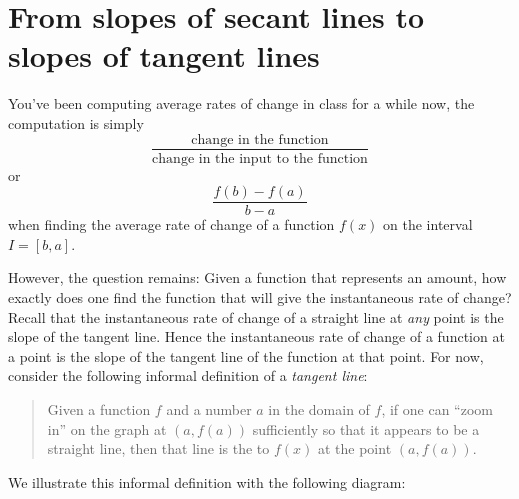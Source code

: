 \documentclass{ximera}
\begin{document}
\section{From slopes of secant lines to slopes of tangent lines}

You've been computing average rates of change in class for a while now,
the computation is simply
\[
\frac{\text{change in the function}}{\text{change in the input to the
    function}}
\]
or
\[
\frac{f(b)-f(a)}{b-a}
\]
when finding the average rate of change of a function $f(x)$ on the interval $I=[b,a]$.


However, the question remains: Given a function that represents an
amount, how exactly does one find the function that will give the
instantaneous rate of change? Recall that the instantaneous rate of change
of a straight line at \emph{any} point is the slope of the tangent line.  Hence the instantaneous rate of
change of a function at a point is the slope of the tangent line of the function at that point.
For now, consider the following informal definition of a \textit{tangent line}:
\begin{quote}
Given a function $f$ and a number $a$ in the domain of $f$, if one can ``zoom in''
on the graph at $(a, f(a))$ sufficiently so that it appears to be a straight line,
then that line is the  to $f(x)$ at the point $(a,f(a))$.
\end{quote}
We illustrate this informal definition with the following diagram:
\end{document}
